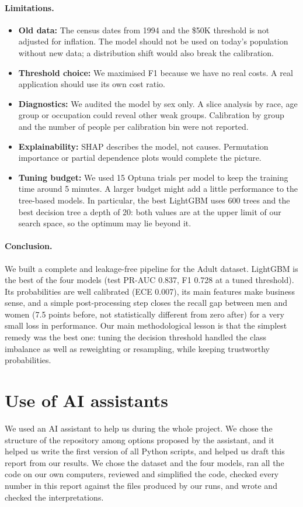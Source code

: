 \documentclass[11pt,a4paper]{article}
\begin{document}
\paragraph{Limitations.}
\begin{itemize}
  \item \textbf{Old data:} The census dates from 1994 and the \$50K threshold is not adjusted for inflation. The model should not be used on today's population without new data; a distribution shift would also break the calibration.
  \item \textbf{Threshold choice:} We maximised F1 because we have no real costs. A real application should use its own cost ratio.
  \item \textbf{Diagnostics:} We audited the model by sex only. A slice analysis by race, age group or occupation could reveal other weak groups. Calibration by group and the number of people per calibration bin were not reported.
  \item \textbf{Explainability:} SHAP describes the model, not causes. Permutation importance or partial dependence plots would complete the picture.
  \item \textbf{Tuning budget:} We used 15 Optuna trials per model to keep the training time around 5 minutes. A larger budget might add a little performance to the tree-based models. In particular, the best LightGBM uses 600 trees and the best decision tree a depth of 20: both values are at the upper limit of our search space, so the optimum may lie beyond it.
\end{itemize}

\paragraph{Conclusion.}
We built a complete and leakage-free pipeline for the Adult dataset. LightGBM is the best of the four models (test PR-AUC 0.837, F1 0.728 at a tuned threshold). Its probabilities are well calibrated (ECE 0.007), its main features make business sense, and a simple post-processing step closes the recall gap between men and women (7.5 points before, not statistically different from zero after) for a very small loss in performance.
Our main methodological lesson is that the simplest remedy was the best one: tuning the decision threshold handled the class imbalance as well as reweighting or resampling, while keeping trustworthy probabilities.

\section*{Use of AI assistants}
We used an AI assistant to help us during the whole project. We chose the structure of the repository among options proposed by the assistant, and it helped us write the first version of all Python scripts, and helped us draft this report from our results. We chose the dataset and the four models, ran all the code on our own computers, reviewed and simplified the code, checked every number in this report against the files produced by our runs, and wrote and checked the interpretations.
\end{document}
